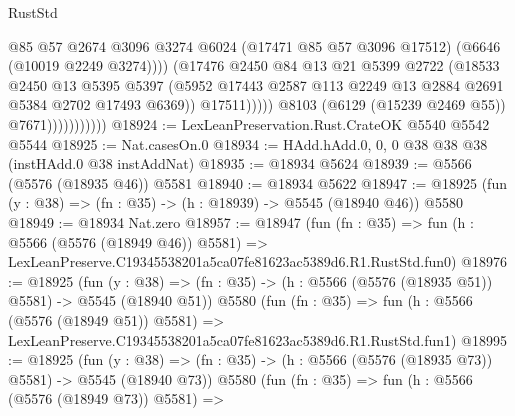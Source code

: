 \begin{lexlean}{RustStd}
\begin{coremodule}
                                      @85
                                      @57
                                      @2674
                                      @3096
                                      @3274
                                      @6024
                                      (@17471 @85 @57 @3096 @17512)
                                      (@6646 (@10019 @2249 @3274))))
                                  (@17476
                                    @2450
                                    @84
                                    @13
                                    @21
                                    @5399
                                    @2722
                                    (@18533
                                      @2450
                                      @13
                                      @5395
                                      @5397
                                      (@5952
                                        @17443
                                        @2587
                                        @113
                                        @2249
                                        @13
                                        @2884
                                        @2691
                                        @5384
                                        @2702
                                        @17493
                                        @6369))
                                    @17511)))))
                          @8103
                          (@6129 (@15239 @2469 @55))
                          @7671)))))))))))
@18924 := LexLeanPreservation.Rust.CrateOK @5540 @5542 @5544
@18925 := Nat.casesOn.{0}
@18934 := HAdd.hAdd.{0, 0, 0} @38 @38 @38 (instHAdd.{0} @38 instAddNat)
@18935 := @18934 @5624
@18939 := @5566 (@5576 (@18935 @46)) @5581
@18940 := @18934 @5622
@18947 := @18925 (fun (y : @38) => (fn : @35) -> (h : @18939) -> @5545 (@18940 @46)) @5580
@18949 := @18934 Nat.zero
@18957 := @18947
    (fun (fn : @35) =>
    fun (h : @5566 (@5576 (@18949 @46)) @5581) =>
    LexLeanPreserve.C19345538201a5ca07fe81623ac5389d6.R1.RustStd.fun0)
@18976 := @18925
    (fun (y : @38) => (fn : @35) -> (h : @5566 (@5576 (@18935 @51)) @5581) -> @5545 (@18940 @51))
    @5580
    (fun (fn : @35) =>
    fun (h : @5566 (@5576 (@18949 @51)) @5581) =>
    LexLeanPreserve.C19345538201a5ca07fe81623ac5389d6.R1.RustStd.fun1)
@18995 := @18925
    (fun (y : @38) => (fn : @35) -> (h : @5566 (@5576 (@18935 @73)) @5581) -> @5545 (@18940 @73))
    @5580
    (fun (fn : @35) =>
    fun (h : @5566 (@5576 (@18949 @73)) @5581) =>

\end{coremodule}
\end{lexlean}
